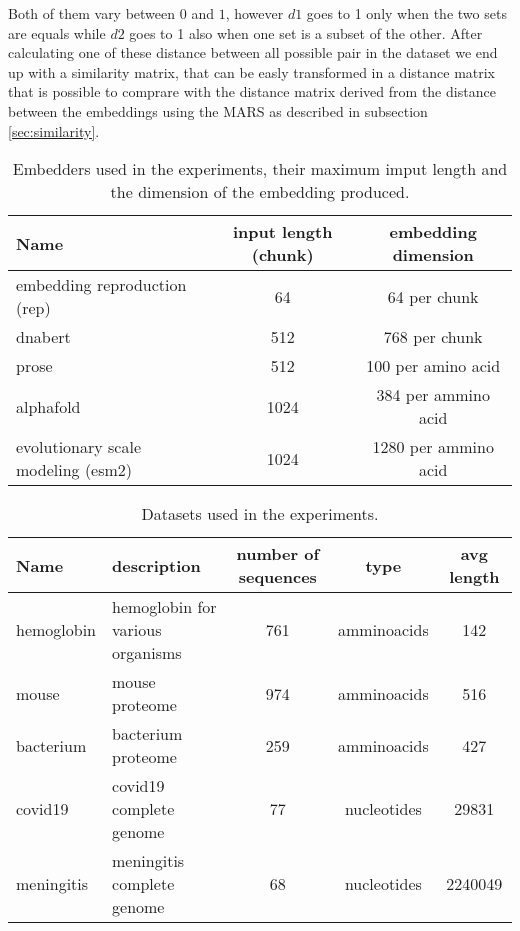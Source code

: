 \documentclass[12pt, letterpaper, twocolumn]{article}
\begin{document}
Both of them vary between $0$ and $1$, however $d1$ goes to 1 only when the two sets are equals while $d2$ goes to 1 also when one set is a subset of the other. After calculating one of these distance between all possible pair in the dataset we end up with a similarity matrix, that can be easly transformed in a distance matrix that is possible to comprare with the distance matrix derived from the distance between the embeddings using the MARS as described in subsection \ref{sec:similarity}.


\onecolumn
\begin{table}[htb]
\centering
\begin{tabular}{|l c c|} 
    \hline
    Name & input length (chunk) & embedding dimension  \\ 
    \hline
    embedding reproduction (rep)\cite{yang2018learned}       & 64    & 64 per chunk   \\
    dnabert \cite{ji2021dnabert}                     & 512     & 768 per chunk \\
    prose   \cite{bepler2021learning}                   & 512   & 100 per amino acid   \\
    alphafold  \cite{jumper2021highly}                 & 1024   & 384 per ammino acid\\
    evolutionary scale modeling (esm2) \cite{lin2022language}   & 1024    & 1280 per ammino acid \\  
    \hline
\end{tabular}
\caption{Embedders used in the experiments, their maximum imput length and the dimension of the embedding produced.}
\label{tab:embedders}
\end{table}
\twocolumn


\onecolumn
\begin{table}[htb]
\centering
\begin{tabular}{|p{3cm} p{3cm} c c c |} 
    \hline
    Name & description & number of sequences & type & avg length   \\ 
    \hline
    hemoglobin &  hemoglobin for various organisms & 761 & amminoacids & 142  \\
    \hline
    mouse & mouse proteome     & 974 & amminoacids & 516 \\
    \hline
    bacterium & bacterium proteome  & 259 &  amminoacids & 427  \\
    \hline
    covid19 & covid19 complete genome & 77 & nucleotides & 29831  \\
    \hline
    meningitis & meningitis complete genome & 68 & nucleotides & 2240049 \\
    \hline
\end{tabular}
\caption{Datasets used in the experiments.}
\label{tab:dataset}
\end{table}
\twocolumn
\end{document}
